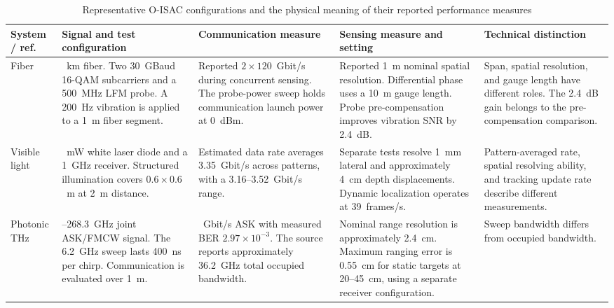 \begin{table}[!t]
\caption{Representative O-ISAC configurations and the physical meaning of
their reported performance measures}
\label{tab:section2_quantitative_examples}
\centering
\begingroup
\footnotesize
\setlength{\tabcolsep}{4pt}
\renewcommand{\arraystretch}{1.15}
\begin{tabularx}{\textwidth}{@{}
>{\raggedright\arraybackslash}p{}
>{\raggedright\arraybackslash}p{}
>{\raggedright\arraybackslash}p{}
>{\raggedright\arraybackslash}p{}
>{\raggedright\arraybackslash}X@{}}
\toprule
\textbf{System / ref.} &
\textbf{Signal and test configuration} &
\textbf{Communication measure} &
\textbf{Sensing measure and setting} &
\textbf{Technical distinction} \\
\midrule
Fiber\newline\cite{OISAC_SCR00057} &
40~km fiber. Two 30~GBaud 16-QAM subcarriers and a 500~MHz LFM probe.
A 200~Hz vibration is applied to a 1~m fiber segment. &
Reported $2\times120$~Gbit/s during concurrent sensing.
The probe-power sweep holds communication launch power at 0~dBm. &
Reported 1~m nominal spatial resolution.
Differential phase uses a 10~m gauge length.
Probe pre-compensation improves vibration SNR by 2.4~dB. &
Span, spatial resolution, and gauge length have different roles.
The 2.4~dB gain belongs to the pre-compensation comparison. \\
\addlinespace[4pt]
Visible light\newline\cite{OISAC_SCR00196} &
225~mW white laser diode and a 1~GHz receiver.
Structured illumination covers $0.6\times0.6$~m at 2~m distance. &
Estimated data rate averages 3.35~Gbit/s across patterns,
with a 3.16--3.52~Gbit/s range. &
Separate tests resolve 1~mm lateral and approximately 4~cm depth
displacements. Dynamic localization operates at 39~frames/s. &
Pattern-averaged rate, spatial resolving ability, and tracking update rate
describe different measurements. \\
\addlinespace[4pt]
Photonic THz\newline\cite{OISAC_SCR00083} &
262.1--268.3~GHz joint ASK/FMCW signal.
The 6.2~GHz sweep lasts 400~ns per chirp.
Communication is evaluated over 1~m. &
15~Gbit/s ASK with measured BER $2.97\times10^{-3}$.
The source reports approximately 36.2~GHz total occupied bandwidth. &
Nominal range resolution is approximately 2.4~cm.
Maximum ranging error is 0.55~cm for static targets at 20--45~cm,
using a separate receiver configuration. &
Sweep bandwidth differs from occupied bandwidth.

\end{tabularx}
\end{table}
